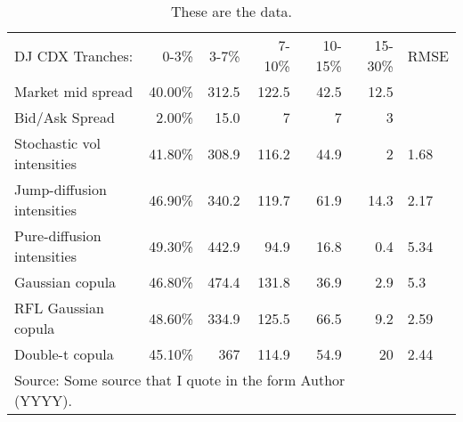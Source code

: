 \begin{table}
\caption{These are the data.} \label{tab:data}
\begin{center}
\begin{tabular}{l|rrrrrl}
\hline \hline
DJ CDX Tranches: &      0-3\% &      3-7\% &     7-10\% &    10-15\% &    15-30\% &       RMSE \\

Market mid spread &    40.00\% &      312.5 &      122.5 &       42.5 &       12.5 &            \\

Bid/Ask Spread &     2.00\% &         15.0 &          7 &          7 &          3 &            \\

Stochastic vol intensities &    41.80\% &      308.9 &      116.2 &       44.9 &          2 &       1.68 \\

Jump-diffusion intensities &    46.90\% &      340.2 &      119.7 &       61.9 &       14.3 &       2.17 \\

Pure-diffusion intensities &    49.30\% &      442.9 &       94.9 &       16.8 &        0.4 &       5.34 \\

Gaussian copula &    46.80\% &      474.4 &      131.8 &       36.9 &        2.9 &        5.3 \\

RFL Gaussian copula &    48.60\% &      334.9 &      125.5 &       66.5 &        9.2 &       2.59 \\

Double-t copula &    45.10\% &        367 &      114.9 &       54.9 &         20 &       2.44 \\
\hline \hline
\multicolumn{ 6}{l}{Source: Some source that I quote in the form Author (YYYY).} &

\end{tabular}
\end{center}
\end{table} 